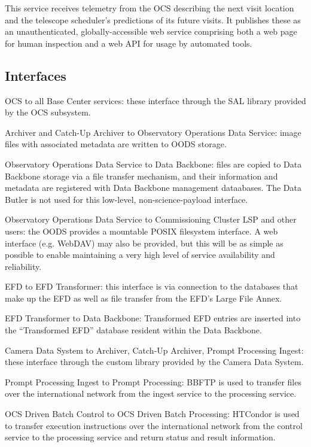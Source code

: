 \documentclass[DM,toc]{lsstdoc}
\begin{document}
This service receives telemetry from the OCS describing the next visit location and the telescope scheduler's predictions of its future visits.
It publishes these as an unauthenticated, globally-accessible web service comprising both a web page for human inspection and a web API for usage by automated tools.

\subsection{Interfaces}\label{base-interfaces}

OCS to all Base Center services: these interface through the SAL
library provided by the OCS subsystem.

Archiver and Catch-Up Archiver to Observatory Operations Data Service:
image files with associated metadata are written to OODS storage.

Observatory Operations Data Service to Data Backbone: files are copied to
Data Backbone storage via a file transfer mechanism, and their
information and metadata are registered with Data Backbone management
dataabases. The Data Butler is not used for this low-level,
non-science-payload interface.

Observatory Operations Data Service to Commissioning Cluster LSP and other users: the OODS provides a mountable POSIX filesystem interface. A web interface (e.g. WebDAV) may also be provided, but this will be as simple as possible to enable maintaining a very high level of service availability and reliability.

EFD to EFD Transformer: this interface is via connection to the
databases that make up the EFD as well as file transfer from the EFD's
Large File Annex.

EFD Transformer to Data Backbone: Transformed EFD entries are inserted
into the ``Transformed EFD'' database resident within the Data Backbone.

Camera Data System to Archiver, Catch-Up Archiver, Prompt Processing
Ingest: these interface through the custom library provided by the
Camera Data System.

Prompt Processing Ingest to Prompt Processing: BBFTP is used to transfer
files over the international network from the ingest service to the
processing service.

OCS Driven Batch Control to OCS Driven Batch Processing: HTCondor is
used to transfer execution instructions over the international network
from the control service to the processing service and return status and
result information.
\end{document}

